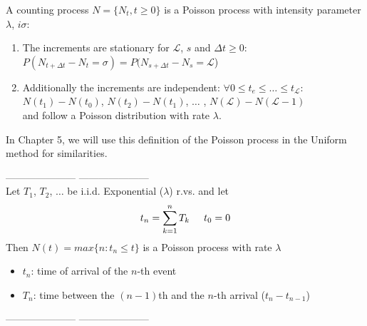 A counting process $N=\{N_t, t\geq0\}$ is a Poisson process with intensity parameter $\lambda$, $i\sigma$:
\begin{enumerate}
    \item The increments are stationary for $\mathscr{L}$, $s$ and $\Delta t\geq0:$\\
    $P(N_{t+\Delta t} - N_t = \sigma) = P (N_{s+\Delta t} -N_s = \mathscr{L}$)
    \item Additionally the increments are independent: $\forall 0\leq t_e \leq \ldots \leq t_\mathscr{L}$:\\
    $N(t_1)-N(t_0)$, $N(t_2)-N(t_1)$, $\ldots$ , $N(\mathscr{L}) - N(\mathscr{L}-1)$\\
    and follow a Poisson distribution with rate $\lambda$.
\end{enumerate}
In Chapter 5, we will use this definition of the Poisson process in the Uniform method for similarities.

---------------------
---------------------\\
Let $T_1$, $T_2$, $\ldots$ be i.i.d. Exponential ($\lambda$) r.vs. and let
\begin{equation}
t_{n} = \sum_{k=1}^{n} T_k \hspace{0.5cm}t_0=0
\end{equation} 
Then $N(t) = max\{n: t_n \leq t\}$ is a Poisson process with rate $\lambda$
\begin{itemize}
    \item $t_n$: time of arrival of the $n$-th event
    \item $T_n$: time between the $(n-1)$th and the $n$-th arrival ($t_n - t_{n-1}$)
\end{itemize}

---------------------
---------------------\\

